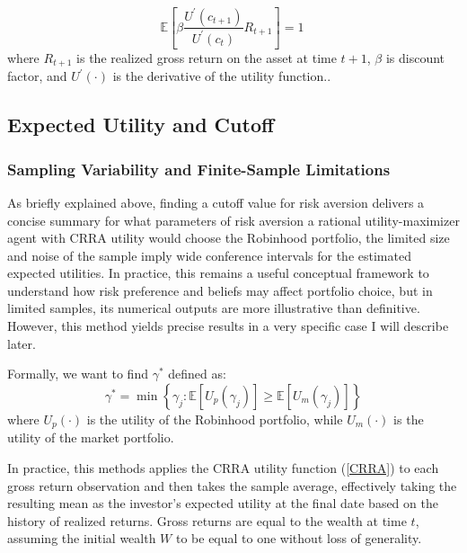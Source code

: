 \begin{equation}
    \mathbb{E}\left[ \beta \frac{U^\prime(c_{t+1})}{U^\prime(c_{t})}R_{t+1} \right] = 1\
    \label{euler_def}
\end{equation}  
where $R_{t+1}$ is the realized gross return on the asset at time $t+1$, $\beta$ is discount factor, and $U^\prime(\cdot)$ is the derivative of the utility function..


\subsection{Expected Utility and Cutoff}
\subsubsection{Sampling Variability and Finite-Sample Limitations}
As briefly explained above, finding a cutoff value for risk aversion delivers a concise summary for what parameters of risk aversion a rational utility-maximizer agent with CRRA utility would choose the Robinhood portfolio,
the limited size and noise of the sample imply wide conference intervals for the estimated expected utilities.
In practice, this remains a useful conceptual framework to understand how risk preference and beliefs may affect portfolio choice, but in limited samples, its numerical outputs are more illustrative than definitive.
However, this method yields precise results in a very specific case I will describe later. 

Formally, we want to find $\gamma^*$ defined as:
\begin{equation}
    \gamma^* = \min\left\{ \gamma_j : \mathbb{E}[U_p(\gamma_j)] \geq \mathbb{E}[U_m(\gamma_j)] \right\}
    \label{gamma_cutoff}
\end{equation}
where $U_p(\cdot)$ is the utility of the Robinhood portfolio, while $U_m(\cdot)$ is the utility of the market portfolio.

In practice, this methods applies the CRRA utility function (\ref{CRRA}) to each gross return observation and then takes the sample average,
effectively taking the resulting mean as the investor's expected utility at the final date based on the history of realized returns.
Gross returns are equal to the wealth at time $t$, assuming the initial wealth $W$ to be equal to one without loss of generality.

